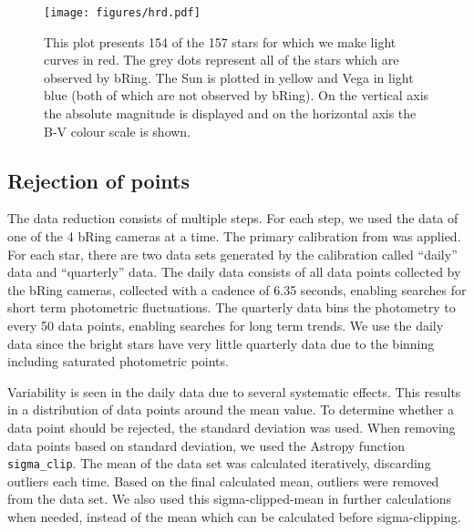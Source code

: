 \documentclass{aa}
\begin{document}
\begin{figure}
    \centering
    \texttt{[image: figures/hrd.pdf]}
    \caption{This plot presents 154 of the 157 stars for which we make light curves in red.
      The grey dots represent all of the stars which are observed by bRing.
      The Sun is plotted in yellow and Vega in light blue (both of which are not observed by bRing).
      On the vertical axis the absolute magnitude is displayed and on the horizontal axis the B-V colour scale is shown.}
    \label{HRD}
  \end{figure}

\subsection{Rejection of points}

The data reduction consists of multiple steps.
%
For each step, we used the data of one of the 4 bRing cameras at a time.
%
The primary calibration from \cite{Talens_2018} was applied.
%
For each star, there are two data sets generated by the calibration called ``daily'' data and ``quarterly'' data.
%
The daily data consists of all data points collected by the bRing cameras, collected with a cadence of 6.35 seconds, enabling searches for short term photometric fluctuations.
%
The quarterly data bins the photometry to every 50 data points, enabling searches for long term trends.
%
We use the daily data since the bright stars have very little quarterly data due to the binning including saturated photometric points.

Variability is seen in the daily data due to several systematic effects.
%
This results in a distribution of data points around the mean value.
%
To determine whether a data point should be rejected, the standard deviation was used.
%
When removing data points based on standard deviation, we used the Astropy function \texttt{sigma\_clip}.
%
The mean of the data set was calculated iteratively, discarding outliers each time.
%
Based on the final calculated mean, outliers were removed from the data set.
%
We also used this sigma-clipped-mean in further calculations when needed, instead of the mean which can be calculated before sigma-clipping.
\end{document}
